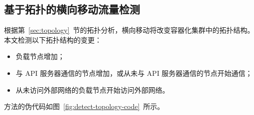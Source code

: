 {\subsection{基于拓扑的横向移动流量检测}
\label{sec:detect-on-topology}

根据第~\ref{sec:topology}~节的拓扑分析，横向移动将改变容器化集群中的拓扑结构。本文检测以下拓扑结构的变更：

\begin{itemize}
    \item 负载节点增加；
    \item 与 API 服务器通信的节点增加，或从未与 API 服务器通信的节点开始通信；
    \item 从未访问外部网络的负载节点开始访问外部网络。
\end{itemize}

方法的伪代码如图~\ref{fig:detect-topology-code}~所示。

}
